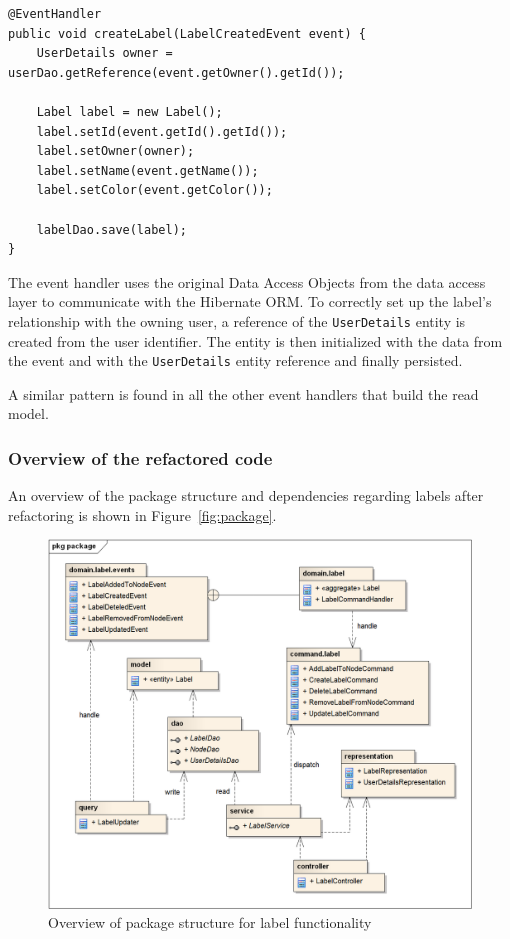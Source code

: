 \documentclass{book}
\begin{document}
\begin{lstlisting}[caption={The event handler (listener) for \texttt{LabelCreatedEvent}},label={lst:labelCreatedEvent},captionpos=b,float,floatplacement=H]
@EventHandler
public void createLabel(LabelCreatedEvent event) {
    UserDetails owner = userDao.getReference(event.getOwner().getId());

    Label label = new Label();
    label.setId(event.getId().getId());
    label.setOwner(owner);
    label.setName(event.getName());
    label.setColor(event.getColor());

    labelDao.save(label);
}
\end{lstlisting}

The event handler uses the original Data Access Objects from the data
access layer to communicate with the Hibernate ORM. To correctly set up
the label's relationship with the owning user, a reference of the
\texttt{UserDetails} entity is created from the user identifier. The
entity is then initialized with the data from the event and with the
\texttt{UserDetails} entity reference and finally persisted.

A similar pattern is found in all the other event handlers that build
the read model.


\subsubsection{Overview of the refactored
code}\label{overview-of-the-refactored-code}

An overview of the package structure and dependencies regarding labels
after refactoring is shown in Figure~\ref{fig:package}.


\begin{figure}[h!]
\begin{center}
\includegraphics[width=0.98\columnwidth]{figures/package/package}
\caption{Overview of package structure for label functionality%
}
\end{center}
\end{figure}
\end{document}
